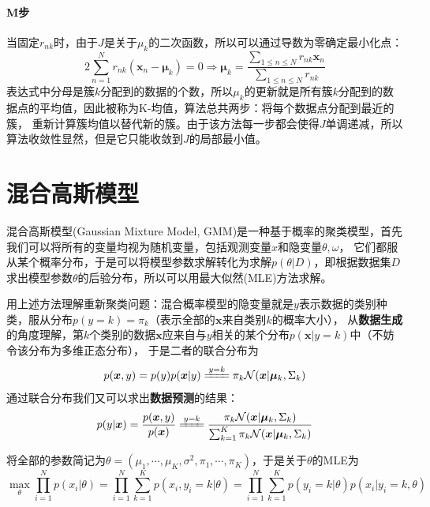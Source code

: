 \documentclass[12pt, a4paper, oneside]{ctexart}
\let\leq=\leqslant %
\def\bd{\boldsymbol}        %
\def\disp{\displaystyle}    %
\begin{document}
\paragraph*{M步}当固定$r_{nk}$时，由于$J$是关于$\mu_k$的二次函数，所以可以通过导数为零确定最小化点：
\begin{equation*}
    2\sum_{n=1}^Nr_{nk}(\bd{x}_n-\bd{\mu}_k) = 0\Rightarrow \bd{\mu}_k=\frac{\disp\sum_{1\leq n\leq N}r_{nk}\bd{x}_n}{\disp\sum_{1\leq n\leq N}r_{nk}}
\end{equation*}
表达式中分母是簇$k$分配到的数据的个数，所以$\mu_k$的更新就是所有簇$k$分配到的数据点的平均值，因此被称为K-均值，算法总共两步：将每个数据点分配到最近的簇，
重新计算簇均值以替代新的簇。由于该方法每一步都会使得$J$单调递减，所以算法收敛性显然，但是它只能收敛到$J$的局部最小值。
\section{混合高斯模型}
混合高斯模型(Gaussian Mixture Model, GMM)是一种基于概率的聚类模型，首先我们可以将所有的变量均视为随机变量，包括观测变量$x$和隐变量$\theta,\omega$，
它们都服从某个概率分布，于是可以将模型参数求解转化为求解$p(\theta|D)$，即根据数据集$D$求出模型参数$\theta$的后验分布，所以可以用最大似然(MLE)方法求解。

用上述方法理解重新聚类问题：混合概率模型的隐变量就是$y$表示数据的类别种类，服从分布$p(y=k) = \pi_k$（表示全部的$\bd{x}$来自类别$k$的概率大小），
从\textbf{数据生成}的角度理解，第$k$个类别的数据$\bd{x}$应来自与$y$相关的某个分布$p(\bd{x}|y=k)$中（不妨令该分布为多维正态分布），
于是二者的联合分布为
\begin{equation*}
p(\bd{x},y) = p(y)p(\bd{x}|y) \xlongequal{y=k} \pi_k\mathcal{N}(\bd{x}|\bd{\mu}_k,\Sigma_k)   
\end{equation*}
通过联合分布我们又可以求出\textbf{数据预测}的结果：
\begin{equation*}
p(y|\bd{x}) = \frac{p(\bd{x},y)}{p(\bd{x})} \xlongequal{y=k} \frac{\pi_k\mathcal{N}(\bd{x}|\bd{\mu}_k,\Sigma_k)}{\sum_{k=1}^K\pi_k\mathcal{N}(\bd{x}|\bd{\mu}_k,\Sigma_k)}
\end{equation*}

将全部的参数简记为$\theta = (\mu_1,\cdots,\mu_K,\sigma^2,\pi_1,\cdots,\pi_K)$，于是关于$\theta$的MLE为
\begin{equation}\label{eq-MLE}
    \max_{\theta}\prod_{i=1}^Np(x_i|\theta) = \prod_{i=1}^N\sum_{k=1}^Kp(x_i,y_i=k|\theta) = \prod_{i=1}^N\sum_{k=1}^Kp(y_i=k|\theta)p(x_i|y_i=k,\theta)
\end{equation}
\end{document}
